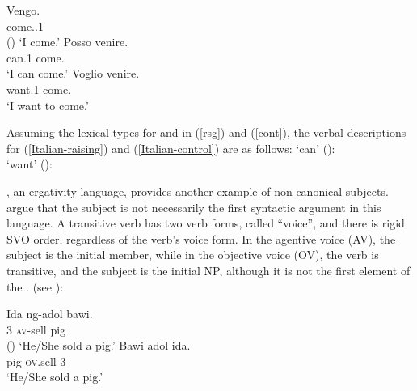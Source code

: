 \eal
\ex 
\label{Italian}
\gll Vengo.\\
     come.\PRS.1\SG\\\hfill()
\glt `I come.'
\ex 
\label{Italian-raising}
\gll Posso venire.\\
     can.1\SG{} come.\INF\\
\glt `I can come.'
\ex 
\label{Italian-control}
\gll Voglio venire.\\ 
     want.1\SG{} come.\INF\\
\glt `I want to come.'
\zl

Assuming the lexical types for  and  in (\ref{rsg}) and
(\ref{cont}), the verbal descriptions for (\ref{Italian-raising}) and (\ref{Italian-control}) are as
follows:
\eal
\ex	
{} `can' ():\\
\label{rais1}
\ex 
{} `want' ():\\
\zl


, an ergativity language, provides another example of non-canonical subjects.  \citep{WechslerandArka1998} argue that the subject is not necessarily the first syntactic argument in this language. A transitive verb has two verb forms, called ``voice'', and there is  rigid SVO order,
regardless of the verb's voice form. In the agentive voice (AV), the
subject is the \argst initial member, while in the objective voice (OV), the verb is transitive, and
the subject is the initial NP, although it is not the first element of the \argstl.
   (see
):

\eal
\ex  
\gll Ida ng-adol bawi.\\
     3\SG{} \textsc{av}-sell pig\\ \hfill()
\glt `He/She sold a pig.'
\ex 
\gll Bawi adol ida.\\
     pig \textsc{ov}.sell 3\SG \\
\glt `He/She sold a pig.' 
\zl

